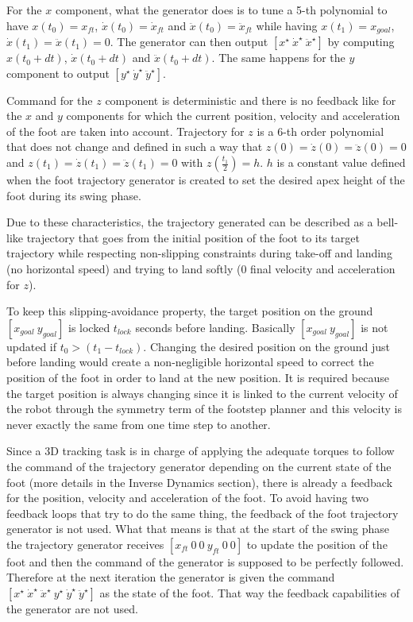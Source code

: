 \documentclass[a4paper,11pt]{article}
\begin{document}
For the $x$ component, what the generator does is to tune a 5-th polynomial to have $x(t_0) = x_{ft}$, $\dot x(t_0) = \dot x_{ft}$ and $\ddot x(t_0) = \ddot x_{ft}$ while having $x(t_1) = x_{goal}$, $\dot x(t_1) = \ddot x(t_1) = 0$. The generator can then output $[x^\star ~ \dot x^\star ~ \ddot x^\star]$ by computing $x(t_0 + dt)$, $\dot x(t_0 + dt)$ and $\ddot x(t_0 + dt)$. The same happens for the $y$ component to output $[y^\star ~ \dot y^\star ~ \ddot y^\star]$.

Command for the $z$ component is deterministic and there is no feedback like for the $x$ and $y$ components for which the current position, velocity and acceleration of the foot are taken into account. Trajectory for $z$ is a 6-th order polynomial that does not change and defined in such a way that $z(0) = \dot z(0) = \ddot z(0) = 0$ and $z(t_1) = \dot z(t_1) = \ddot z(t_1) = 0$ with $z(\frac{t_1}{2}) = h$. $h$ is a constant value defined when the foot trajectory generator is created to set the desired apex height of the foot during its swing phase.

Due to these characteristics, the trajectory generated can be described as a bell-like trajectory that goes from the initial position of the foot to its target trajectory while respecting non-slipping constraints during take-off and landing (no horizontal speed) and trying to land softly (0 final velocity and acceleration for $z$).

To keep this slipping-avoidance property, the target position on the ground $[x_{goal} ~ y_{goal}]$ is locked $t_{lock}$ seconds before landing. Basically $[x_{goal} ~ y_{goal}]$ is not updated if $t_0 > (t_1-t_{lock})$. Changing the desired position on the ground just before landing would create a non-negligible horizontal speed to correct the position of the foot in order to land at the new position. It is required because the target position is always changing since it is linked to the current velocity of the robot through the symmetry term of the footstep planner and this velocity is never exactly the same from one time step to another. 

Since a 3D tracking task is in charge of applying the adequate torques to follow the command of the trajectory generator depending on the current state of the foot (more details in the Inverse Dynamics section), there is already a feedback for the position, velocity and acceleration of the foot. To avoid having two feedback loops that try to do the same thing, the feedback of the foot trajectory generator is not used. What that means is that at the start of the swing phase the trajectory generator receives $[x_{ft} ~ 0 ~ 0 ~ y_{ft} ~ 0 ~ 0]$ to update the position of the foot and then the command of the generator is supposed to be perfectly followed. Therefore at the next iteration the generator is given the command $[x^\star ~ \dot x^\star ~ \ddot x^\star ~ y^\star ~ \dot y^\star ~ \ddot y^\star]$ as the state of the foot. That way the feedback capabilities of the generator are not used.
\end{document}
